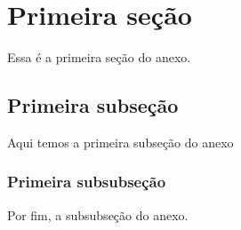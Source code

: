 \section{Primeira seção}

Essa é a primeira seção do anexo.

\subsection{Primeira subseção}

Aqui temos a primeira subseção do anexo

\subsubsection{Primeira subsubseção}

Por fim, a subsubseção do anexo.